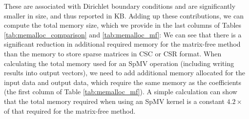 These are associated with Dirichlet boundary conditions and are significantly smaller in size, and thus reported in KB. Adding up these contributions, we can compute the total memory size, which we provide in the last columns of Tables \ref{tab:memalloc_comparison} and \ref{tab:memalloc_mf}: We can see that there is a significant reduction in additional required memory for the matrix-free method than the memory to store sparse matrices in CSC or CSR format. When calculating the total memory used for an SpMV operation (including writing results into output vectors), we need to add additional memory allocated for the input data and output data, which require the same memory as the coefficients (the first column of Table \ref{tab:memalloc_mf}). A simple calculation can show that the total memory required when using an SpMV kernel is a constant $4.2\times$ of that required for the matrix-free method. 